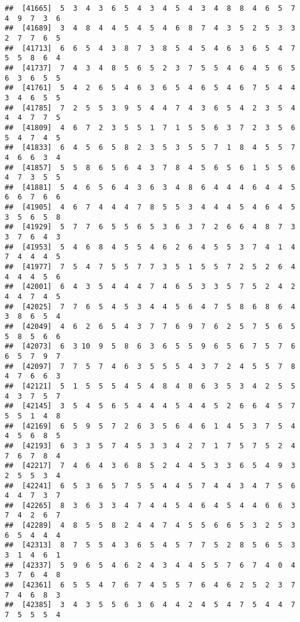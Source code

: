 \documentclass[
]{book}
\begin{document}
\begin{verbatim}
##  [41665]  5  3  4  3  6  5  4  3  4  5  4  3  4  8  8  4  6  5  7  4  9  7  3  6
##  [41689]  3  4  8  4  4  5  4  5  4  6  8  7  4  3  5  2  5  3  3  2  7  7  6  5
##  [41713]  6  6  5  4  3  8  7  3  8  5  4  5  4  6  3  6  5  4  7  5  5  8  6  4
##  [41737]  7  4  3  4  8  5  6  5  2  3  7  5  5  4  6  4  5  6  5  6  3  6  5  5
##  [41761]  5  4  2  6  5  4  6  3  6  5  4  6  5  4  6  7  5  4  4  3  4  6  5  5
##  [41785]  7  2  5  5  3  9  5  4  4  7  4  3  6  5  4  2  3  5  4  4  4  7  7  5
##  [41809]  4  6  7  2  3  5  5  1  7  1  5  5  6  3  7  2  3  5  6  5  4  7  4  5
##  [41833]  6  4  5  6  5  8  2  3  5  3  5  5  7  1  8  4  5  5  7  4  6  6  3  4
##  [41857]  5  5  8  6  5  6  4  3  7  8  4  5  6  5  6  1  5  5  6  4  7  3  5  5
##  [41881]  5  4  6  5  6  4  3  6  3  4  8  6  4  4  4  6  4  4  5  6  6  7  6  6
##  [41905]  4  6  7  4  4  4  7  8  5  5  3  4  4  4  5  4  6  4  5  3  5  6  5  8
##  [41929]  5  7  7  6  5  5  6  5  3  6  3  7  2  6  6  4  8  7  3  3  7  6  4  3
##  [41953]  5  4  6  8  4  5  5  4  6  2  6  4  5  5  3  7  4  1  4  7  4  4  4  5
##  [41977]  7  5  4  7  5  5  7  7  3  5  1  5  5  7  2  5  2  6  4  4  4  4  5  6
##  [42001]  6  4  3  5  4  4  4  7  4  6  5  3  3  5  7  5  2  4  2  4  4  7  4  5
##  [42025]  7  7  6  5  4  5  3  4  4  5  6  4  7  5  8  6  8  6  4  3  8  6  5  4
##  [42049]  4  6  2  6  5  4  3  7  7  6  9  7  6  2  5  7  5  6  5  5  8  5  6  6
##  [42073]  6  3 10  9  5  8  6  3  6  5  5  9  6  5  6  7  5  7  6  6  5  7  9  7
##  [42097]  7  7  5  7  4  6  3  5  5  5  4  3  7  2  4  5  5  7  8  4  7  6  6  3
##  [42121]  5  1  5  5  5  4  5  4  8  4  8  6  3  5  3  4  2  5  5  4  3  7  5  7
##  [42145]  3  5  4  5  6  5  4  4  4  5  4  4  5  2  6  6  4  5  7  5  5  1  4  8
##  [42169]  6  5  9  5  7  2  6  3  5  6  4  6  1  4  5  3  7  5  4  4  5  6  8  5
##  [42193]  6  3  3  5  7  4  5  3  3  4  2  7  1  7  5  7  5  2  4  7  6  7  8  4
##  [42217]  7  4  6  4  3  6  8  5  2  4  4  5  3  3  6  5  4  9  3  2  5  5  3  4
##  [42241]  6  5  3  6  5  7  5  5  4  4  5  7  4  4  3  4  7  5  6  4  4  7  3  7
##  [42265]  8  3  6  3  3  4  7  4  4  5  4  6  4  5  4  4  6  6  3  7  4  2  6  7
##  [42289]  4  8  5  5  8  2  4  4  7  4  5  5  6  6  5  3  2  5  3  6  5  4  4  4
##  [42313]  8  7  5  5  4  3  6  5  4  5  7  7  5  2  8  5  6  5  3  3  1  4  6  1
##  [42337]  5  9  6  5  4  6  2  4  3  4  4  5  5  7  6  7  4  0  4  3  7  6  4  8
##  [42361]  6  5  5  4  7  6  7  4  5  5  7  6  4  6  2  5  2  3  7  7  4  6  8  3
##  [42385]  3  4  3  5  5  6  3  6  4  4  2  4  5  4  7  5  4  4  7  7  5  5  5  4

\end{verbatim}
\end{document}

